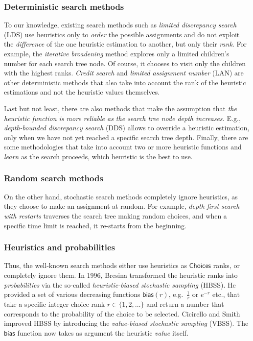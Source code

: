 \documentclass{ws-ijait}
\begin{document}
\subsubsection{Deterministic search
               methods\label{deterministic}}

To our knowledge, existing search methods such as
\emph{limited discrepancy search} (LDS) use heuristics only
to \emph{order} the possible assignments and do not exploit
the \emph{difference} of the one heuristic estimation to
another, but only their \emph{rank}.\cite{lds} For example,
the \emph{iterative broadening} method explores only a
limited children's number for each search tree
node.\cite{ibroad} Of course, it chooses to visit only the
children with the highest ranks. \emph{Credit
search}\cite{dbs} and \emph{limited assignment number}
(LAN)\cite{lan} are other deterministic methods that also
take into account the rank of the heuristic estimations and
not the heuristic values themselves.

Last but not least, there are also methods that make the
assumption that \emph{the heuristic function is more
reliable as the search tree node depth increases.} E.g.,
\emph{depth-bounded discrepancy search} (DDS) allows to
override a heuristic estimation, only when we have not yet
reached a specific search tree depth.\cite{dds} Finally,
there are some methodologies that take into account two or
more heuristic functions and \emph{learn} as the search
proceeds, which heuristic is the best to use.\cite{learn}

\subsubsection{Random search methods\label{random}}

On the other hand, stochastic search methods completely
ignore heuristics, as they choose to make an assignment at
random.\cite{heuristics} For example, \emph{depth first
search with restarts} traverses the search tree making
random choices, and when a specific time limit is reached,
it re-starts from the beginning.

\subsubsection{Heuristics and probabilities}

Thus, the well-known search methods either use heuristics as
$\mathsf{Choices}$ ranks, or completely ignore them. In
1996, Bresina transformed the heuristic ranks into
\emph{probabilities} via the so-called
\emph{heuristic-biased stochastic sampling}
(HBSS).\cite{bresina-hbss} He provided a set of various
decreasing functions $\mathsf{bias}(r)$, e.g.\ $\frac{1}{r}$
or $e^{-r}$ etc., that take a specific integer choice rank
$r \in \{1, 2, \ldots\}$ and return a number that
corresponds to the probability of the choice to be selected.
Cicirello and Smith improved HBSS by introducing the
\emph{value-biased stochastic sampling} (VBSS). The
$\mathsf{bias}$ function now takes as argument the heuristic
\emph{value} itself.\cite{cicirello-vbss}
\end{document}
